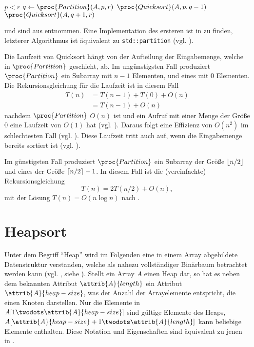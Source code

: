 \begin{codebox}
    \li \If $p < r$
    \li     \Then
                $q \gets \proc{Partition}(A, p, r)$
    \li         $\proc{Quicksort}(A, p, q - 1)$
    \li         $\proc{Quicksort}(A, q + 1, r)$
            \End
\end{codebox}

 und  sind aus \cite[171]{clrs2001} entnommen. Eine Implementation des ersteren ist in  zu finden, letzterer Algorithmus ist äquivalent zu \lstinline{std::partition} (vgl. \cite[927]{ISO-C++17}).

Die Laufzeit von Quicksort hängt von der Aufteilung der Eingabemenge, welche in $\proc{Partition}$ geschieht, ab. Im ungünstigsten Fall produziert $\proc{Partition}$ ein Subarray mit $n - 1$ Elementen, und eines mit $0$ Elementen. Die Rekursionsgleichung für die Laufzeit ist in diesem Fall
\begin{equation}\label{eq:quicks-efficiency}
\begin{split}
    T(n) &= T(n - 1) + T(0) + O(n)\\
    &= T(n - 1) + O(n)
\end{split}
\end{equation}
nachdem $\proc{Partition}$ $O(n)$ ist und ein Aufruf mit einer Menge der Größe $0$ eine Laufzeit von $O(1)$ hat (vgl. \cite[175]{clrs2001}). Daraus folgt eine Effizienz von $O(n^2)$ im schlechtesten Fall (vgl. \cite[1146]{clrs2001}). Diese Laufzeit tritt auch auf, wenn die Eingabemenge bereits sortiert ist (vgl. \cite[175]{clrs2001}).

Im günstigsten Fall produziert $\proc{Partition}$ ein Subarray der Größe $\left\lfloor n/2 \right\rfloor$ und eines der Größe $\left\lceil n/2 \right\rceil - 1$. In diesem Fall ist die (vereinfachte) Rekursionsgleichung
\begin{equation*}
    T(n) = 2T(n/2) + O(n),
\end{equation*}
mit der Lösung $T(n) = O(n \log n)$ nach \cite[94]{clrs2001}.

\section{Heapsort}
\label{sec:alg-selection}

Unter dem Begriff \enquote{Heap} wird im Folgenden eine in einem Array abgebildete Datenstruktur verstanden, welche als nahezu vollständiger Binärbaum betrachtet werden kann (vgl. \cite[87f]{ahu1974}, siehe ). Stellt ein Array $A$ einen Heap dar, so hat es neben dem bekannten Attribut $\attrib{A}{length}$ ein Attribut $\attrib{A}{heap-size}$, was der Anzahl der Arrayelemente entspricht, die einen Knoten darstellen. Nur die Elemente in $A[1 \twodots \attrib{A}{heap-size}]$ sind gültige Elemente des Heaps, $A[\attrib{A}{heap-size} + 1 \twodots \attrib{A}{length}]$ kann beliebige Elemente enthalten. Diese Notation und Eigenschaften sind äquivalent zu jenen in \cite{clrs2001}.

